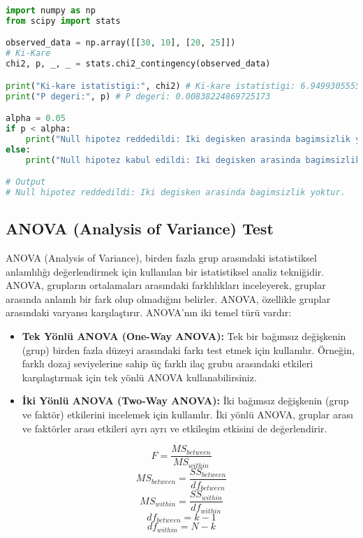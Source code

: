 \begin{lstlisting}[language=Python]
import numpy as np
from scipy import stats

observed_data = np.array([[30, 10], [20, 25]])
# Ki-Kare
chi2, p, _, _ = stats.chi2_contingency(observed_data)

print("Ki-kare istatistigi:", chi2) # Ki-kare istatistigi: 6.949930555555551
print("P degeri:", p) # P degeri: 0.00838224869725173

alpha = 0.05
if p < alpha:
    print("Null hipotez reddedildi: Iki degisken arasinda bagimsizlik yoktur.")
else:
    print("Null hipotez kabul edildi: Iki degisken arasinda bagimsizlik vardir.")

# Output
# Null hipotez reddedildi: Iki degisken arasinda bagimsizlik yoktur.
\end{lstlisting}

\newpage

\subsection{ANOVA (Analysis of Variance) Test}
ANOVA (Analysis of Variance), birden fazla grup arasındaki istatistiksel anlamlılığı değerlendirmek için kullanılan bir istatistiksel analiz tekniğidir. ANOVA, grupların ortalamaları arasındaki farklılıkları inceleyerek, gruplar arasında anlamlı bir fark olup olmadığını belirler. ANOVA, özellikle gruplar arasındaki varyansı karşılaştırır. ANOVA'nın iki temel türü vardır:

\begin{itemize}
    \item \textbf{Tek Yönlü ANOVA (One-Way ANOVA):} Tek bir bağımsız değişkenin (grup) birden fazla düzeyi arasındaki farkı test etmek için kullanılır. Örneğin, farklı dozaj seviyelerine sahip üç farklı ilaç grubu arasındaki etkileri karşılaştırmak için tek yönlü ANOVA kullanabilirsiniz.
    \item \textbf{İki Yönlü ANOVA (Two-Way ANOVA):} İki bağımsız değişkenin (grup ve faktör) etkilerini incelemek için kullanılır. İki yönlü ANOVA, gruplar arası ve faktörler arası etkileri ayrı ayrı ve etkileşim etkisini de değerlendirir.
\end{itemize}

\[ F = \frac{MS_{between}}{MS_{within}} \]
\[ MS_{between} = \frac{SS_{between}}{df_{between}} \]
\[ MS_{within} = \frac{SS_{within}}{df_{within}} \]
\[ df_{between} = k - 1 \]
\[ df_{within} = N - k \]

